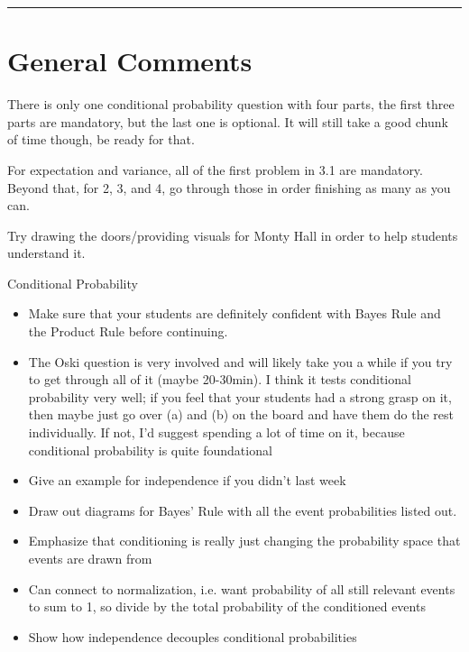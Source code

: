 \documentclass{exam}
\title{}
\date{Random Variables, Conditional Probability, Distributions}
\begin{document}
\maketitle
\rule{\textwidth}{0.15em}
\fontsize{12}{15}\selectfont
\thispagestyle{empty}


\section{General Comments}
\begin{questions}
\item There is only one conditional probability question with four parts, the first three parts are mandatory, but the last one is optional. It will still take a good chunk of time though, be ready for that.
\item For expectation and variance, all of the first problem in 3.1 are mandatory. Beyond that, for 2, 3, and 4, go through those in order finishing as many as you can.
\item Try drawing the doors/providing visuals for Monty Hall in order to help students understand it.
\item Conditional Probability
\begin{itemize}
\item Make sure that your students are definitely confident with Bayes Rule and the Product Rule before continuing. 
\item The Oski question is very involved and will likely take you a while if you try to get through all of it (maybe 20-30min). I think it tests conditional probability very well; if you feel that your students had a strong grasp on it, then maybe just go over (a) and (b) on the board and have them do the rest individually. If not, I'd suggest spending a lot of time on it, because conditional probability is quite foundational
\item Give an example for independence if you didn't last week
\item Draw out diagrams for Bayes' Rule with all the event probabilities listed out.
\item Emphasize that conditioning is really just changing the probability space that events are drawn from
\item Can connect to normalization, i.e. want probability of all still relevant events to sum to 1, so divide by the total probability of the conditioned events 
\item Show how independence decouples conditional probabilities 

\end{itemize}
\end{questions}
\end{document}
